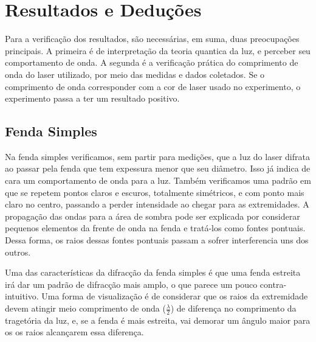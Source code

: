 \section{Resultados e Deduções}\label{result}

Para a verificação dos resultados, são necessárias, em suma, duas preocupações principais. A primeira é de interpretação da teoria quantica da luz, e perceber seu comportamento de onda. A segunda é a verificação prática do comprimento de onda do laser utilizado, por meio das medidas e dados coletados. Se o comprimento de onda corresponder com a cor de laser usado no experimento, o experimento passa a ter um resultado positivo.

\subsection{Fenda Simples}\label{fenda_simples}

Na fenda simples verificamos, sem partir para medições, que a luz do laser difrata ao passar pela fenda que tem expessura menor que seu diâmetro. Isso já indica de cara um comportamento de onda para a luz. Também verificamos uma padrão em que se repetem pontos claros e escuros, totalmente simétricos, e com ponto mais claro no centro, passando a perder intensidade ao chegar para as extremidades. A propagação das ondas para a área de sombra pode ser explicada por considerar pequenos elementos da frente de onda na fenda e tratá-los como fontes pontuais. Dessa forma, os raios dessas fontes pontuais passam a sofrer interferencia uns dos outros.

Uma das características da difracção da fenda simples é que uma fenda estreita irá dar um padrão de difracção mais amplo, o que parece um pouco contra-intuitivo. Uma forma de visualização é de considerar que os raios da extremidade devem atingir meio comprimento de onda ($\frac{\lambda}{2}$) de diferença no comprimento da tragetória da luz, e, se a fenda é mais estreita, vai demorar um ângulo maior para os os raios alcançarem essa diferença.

